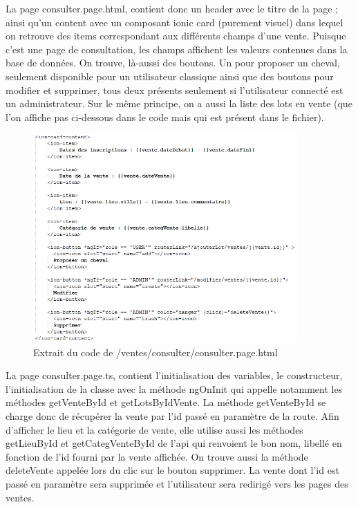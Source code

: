 			La page consulter.page.html, contient donc un header avec le titre de la page ; ainsi qu'un content avec un composant ionic card (purement visuel) dans lequel on retrouve des items correspondant aux différents champs d'une vente.\newline
			Puisque c'est une page de consultation, les champs affichent les valeurs contenues dans la base de données.\newline
			On trouve, là-aussi des boutons. Un pour proposer un cheval, seulement disponible pour un utilisateur classique ainsi que des boutons pour modifier et supprimer, tous deux présents seulement si l'utilisateur connecté est un administrateur. \newline
			Sur le même principe, on a aussi la liste des lots en vente (que l'on affiche pas ci-dessous dans le code mais qui est présent dans le fichier).

			\begin{figure}[H]
				\centering\includegraphics[width=0.9\textwidth, keepaspectratio]{res/consulter.png}
				\caption{Extrait du code de /ventes/consulter/consulter.page.html}
			\end{figure}

			La page consulter.page.ts, contient l'initialisation des variables, le constructeur, l'initialisation de la classe avec la méthode ngOnInit qui appelle notamment les méthodes getVenteById et getLotsByIdVente.\newline
			La méthode getVenteById se charge donc de récupérer la vente par l'id passé en paramètre de la route. Afin d'afficher le lieu et la catégorie de vente, elle utilise aussi les méthodes getLieuById et getCategVenteById de l'api qui renvoient le bon nom, libellé en fonction de l'id fourni par la vente affichée.\newline
			On trouve aussi la méthode deleteVente appelée lors du clic sur le bouton supprimer. La vente dont l'id est passé en paramètre sera supprimée et l'utilisateur sera redirigé vers les pages des ventes.

